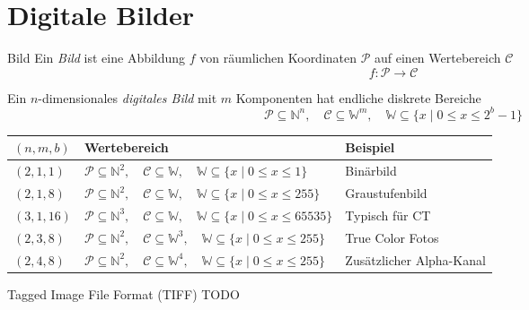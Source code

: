 \section{Digitale Bilder}

\begin{defi}{Bild}
    Ein \emph{Bild} ist eine Abbildung $f$ von räumlichen Koordinaten $\mathcal{P}$ auf einen Wertebereich $\mathcal{C}$
    \[
        f: \mathcal{P} \to \mathcal{C}
    \]

    Ein $n$-dimensionales \emph{digitales Bild} mit $m$ Komponenten hat endliche diskrete Bereiche
    \[
        \mathcal{P} \subseteq \mathbb{N}^n, \quad \mathcal{C} \subseteq \mathbb{W}^m, \quad \mathbb{W} \subseteq \{ x \mid 0 \leq x \leq 2^b - 1 \}
    \]

    \begin{tabularx}{\linewidth}{lXl}
        \toprule
        $(n, m, b)$  & Wertebereich                                                                                                                               & Beispiel                 \\
        \midrule
        $(2, 1, 1)$  & $\mathcal{P} \subseteq \mathbb{N}^2, \quad \mathcal{C} \subseteq \mathbb{W}, \quad \mathbb{W} \subseteq \{ x \mid 0 \leq x \leq 1 \}$      & Binärbild                \\
        $(2, 1, 8)$  & $\mathcal{P} \subseteq \mathbb{N}^2, \quad \mathcal{C} \subseteq \mathbb{W}, \quad \mathbb{W} \subseteq \{ x \mid 0 \leq x \leq 255 \}$    & Graustufenbild           \\
        $(3, 1, 16)$ & $\mathcal{P} \subseteq \mathbb{N}^3, \quad \mathcal{C} \subseteq \mathbb{W}, \quad \mathbb{W} \subseteq \{ x \mid 0 \leq x \leq  65535 \}$ & Typisch für CT           \\
        $(2, 3, 8)$  & $\mathcal{P} \subseteq \mathbb{N}^2, \quad \mathcal{C} \subseteq \mathbb{W}^3, \quad \mathbb{W} \subseteq \{ x \mid 0 \leq x \leq 255 \}$  & True Color Fotos         \\
        $(2, 4, 8)$  & $\mathcal{P} \subseteq \mathbb{N}^2, \quad \mathcal{C} \subseteq \mathbb{W}^4, \quad \mathbb{W} \subseteq \{ x \mid 0 \leq x \leq 255 \}$  & Zusätzlicher Alpha-Kanal \\
        \bottomrule
    \end{tabularx}
\end{defi}

\begin{defi}{Tagged Image File Format (TIFF)}
    TODO
\end{defi}

